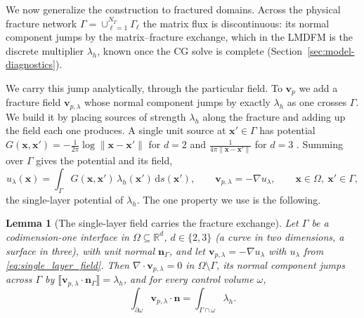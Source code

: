\documentclass[a4paper,fleqn]{cas-sc}
\newcommand{\jump}[1]{\lBrack #1 \rBrack}
\newcommand{\vflux}{\mathbf{v}}
\newcommand{\vp}{\vflux_{p}}              %
\newtheorem{lemma}[theorem]{Lemma}
\begin{document}
We now generalize the construction to fractured domains. Across the physical
fracture network \(\Gamma=\cup_{\ell=1}^{N_\Gamma}\Gamma_\ell\) the matrix flux is
discontinuous: its normal component jumps by the matrix--fracture exchange, which
in the LMDFM is the discrete multiplier \(\lambda_h\), known once the CG solve is
complete (Section~\ref{sec:model-diagnostics}).

We carry this jump analytically, through the particular field. To \(\vp\) we add a
fracture field \(\vflux_{p,\lambda}\) whose normal component jumps by exactly
\(\lambda_h\) as one crosses \(\Gamma\). We build it by placing sources of strength
\(\lambda_h\) along the fracture and adding up the field each one produces. A single
unit source at \(\mathbf{x}'\in\Gamma\) has potential
\(G(\mathbf{x},\mathbf{x}')=-\tfrac{1}{2\pi}\log\|\mathbf{x}-\mathbf{x}'\|\) for
\(d=2\) and \(\tfrac{1}{4\pi\|\mathbf{x}-\mathbf{x}'\|}\) for \(d=3\)
\citep[\S2.2]{Evans2010}. Summing over \(\Gamma\) gives the potential and its field,
\begin{equation}
  u_\lambda(\mathbf{x})
  =
  \int_{\Gamma}
  G(\mathbf{x},\mathbf{x}')\,\lambda_h(\mathbf{x}')\,\mathrm{d}s(\mathbf{x}') ,
  \qquad
  \vflux_{p,\lambda}
  =
  -\nabla u_\lambda ,
  \qquad
  \mathbf{x}\in\Omega,\ \mathbf{x}'\in\Gamma ,
  \label{eq:single_layer_field}
\end{equation}
the single-layer potential of \(\lambda_h\). The one property we use is the
following.

\begin{lemma}[The single-layer field carries the fracture exchange]
\label{lem:single_layer}
Let \(\Gamma\) be a codimension-one interface in \(\Omega\subseteq\mathbb{R}^d\),
\(d\in\{2,3\}\) (a curve in two dimensions, a surface in three), with unit normal
\(\mathbf{n}_\Gamma\), and let \(\vflux_{p,\lambda}=-\nabla u_\lambda\)
with \(u_\lambda\) from \eqref{eq:single_layer_field}. Then
\(\nabla\cdot\vflux_{p,\lambda}=0\) in \(\Omega\setminus\Gamma\), its normal
component jumps across \(\Gamma\) by
\(\jump{\vflux_{p,\lambda}\cdot\mathbf{n}_\Gamma}=\lambda_h\), and for every control
volume \(\omega\),
\[
  \int_{\partial\omega}\vflux_{p,\lambda}\cdot\mathbf{n}
  =
  \int_{\Gamma\cap\omega}\lambda_h .
\]
\end{lemma}
\end{document}
